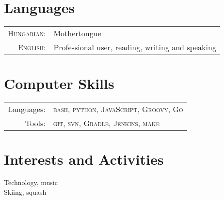\documentclass[a4paper,10pt]{article} %
\begin{document}
\section{Languages}
\begin{tabular}{rl}
\textsc{Hungarian:} & Mothertongue\\
\textsc{English:} &  Professional user, reading, writing and speaking\\
\end{tabular}

\section{Computer Skills}
\begin{tabular}{rl}
Languages: & \textsc{bash}, \textsc{python}, \textsc{JavaScript}, \textsc{Groovy}, \textsc{Go} \\
Tools: &  \textsc{git}, \textsc{svn}, \textsc{Gradle}, \textsc{Jenkins}, \textsc{make}
\end{tabular}

\section{Interests and Activities}
Technology, music \\
Skiing, squash
\end{document}
